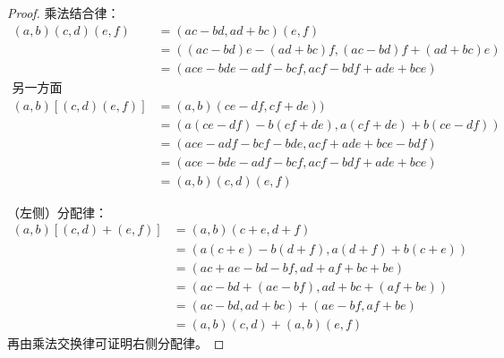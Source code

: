 \documentclass[b5paper]{ctexart}
\begin{document}
\begin{Answer}[ref={ex:complex}]
{\begin{proof}
乘法结合律：
\begin{align*}
(a, b)(c, d)(e, f) &= (ac - bd, ad + bc)(e, f) \\
  &= ((ac - bd)e - (ad + bc)f, (ac - bd)f + (ad + bc)e) \\
  &= (ace - bde - adf - bcf, acf - bdf + ade + bce) \\
\text{另一方面} \\
(a, b)[(c, d)(e, f)] &= (a, b)(ce - df, cf + de)) \\
  &= (a(ce - df) - b(cf + de), a(cf + de) + b(ce - df)) \\
  &= (ace - adf - bcf - bde, acf + ade + bce - bdf) \\
  &= (ace - bde - adf - bcf, acf - bdf + ade + bce) \\
  &= (a, b)(c, d)(e, f)
\end{align*}

（左侧）分配律：
\begin{align*}
(a, b)[(c, d) + (e, f)] &= (a, b)(c + e, d + f) \\
  &= (a(c + e) - b(d + f), a(d + f) + b(c + e)) \\
  &= (ac + ae - bd - bf, ad + af + bc + be) \\
  &= (ac - bd + (ae - bf), ad + bc + (af + be)) \\
  &= (ac - bd, ad + bc) + (ae - bf, af + be) \\
  &= (a, b)(c, d) + (a, b)(e, f)
\end{align*}
再由乘法交换律可证明右侧分配律。
\end{proof}
}


\end{Answer}
\end{document}
